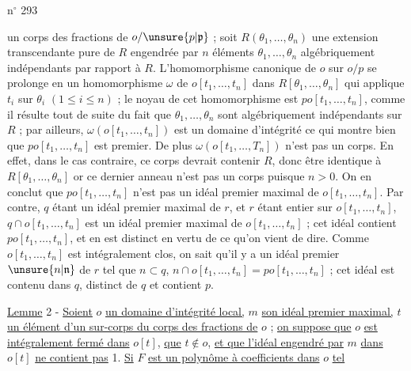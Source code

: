 \hfill n$^\circ$ 293

un corps des fractions de $o/\unsure{p|\mathfrak p}$ ; soit $R(\theta_1,\ldots,\theta_n)$ une extension transcendante pure de $R$ engendrée par $n$ éléments $\theta_1,\ldots,\theta_n$ algébriquement indépendants par rapport à $R$. L'homomorphisme canonique de $o$ sur $o/p$ se prolonge en un homomorphisme $\omega$ de $o[t_1,\ldots,t_n]$ dans $R[\theta_1,\ldots,\theta_n]$ qui applique $t_i$ sur $\theta_i$ $(1\leq i\leq n)$ ; le noyau de cet homomorphisme est $po[t_1,\ldots,t_n]$, comme il résulte tout de suite du fait que $\theta_1,\ldots,\theta_n$ sont algébriquement indépendants sur $R$ ; par ailleurs, $\omega(o[t_1,\ldots,t_n])$ est un domaine d'intégrité ce qui montre bien que $po[t_1,\ldots,t_n]$ est premier. De plus $\omega(o[t_1,\ldots,T_n])$ n'est pas un corps. En effet, dans le cas contraire, ce corps devrait contenir $R$, donc être identique à $R[\theta_1,\ldots,\theta_n]$ or ce dernier anneau n'est pas un corps puisque $n>0$. On en conclut que $po[t_1,\ldots,t_n]$ n'est pas un idéal premier maximal de $o[t_1,\ldots,t_n]$. Par contre, $q$ étant un idéal premier maximal de $r$, et $r$ étant entier sur $o[t_1,\ldots,t_n]$, $q\cap o[t_1,\ldots,t_n]$ est un idéal premier maximal de $o[t_1,\ldots,t_n]$ ; cet idéal contient $po[t_1,\ldots,t_n]$, et en est distinct en vertu de ce qu'on vient de dire. Comme $o[t_1,\ldots,t_n]$ est intégralement clos, on sait qu'il y a un idéal premier $\unsure{n|\mathfrak n}$ de $r$ tel que $n\subset q$, $n\cap o[t_1,\ldots,t_n]=po[t_1,\ldots,t_n]$ ; cet idéal est contenu dans $q$, distinct de $q$ et contient $p$.

\uline{Lemme} 2 - \uline{Soient} $o$ \uline{un domaine d'intégrité local,} $m$ \uline{son idéal premier maximal,} $t$ \uline{un élément d'un sur-corps du corps des fractions de} $o$ ; \uline{on suppose que} $o$ \uline{est intégralement fermé dans} $o[t]$, \uline{que} $t\notin o$, \uline{et que l'idéal engendré par} $m$ \uline{dans} $o[t]$ \uline{ne contient pas} 1. \uline{Si} $F$ \uline{est un polynôme à coefficients dans} $o$ \uline{tel}
